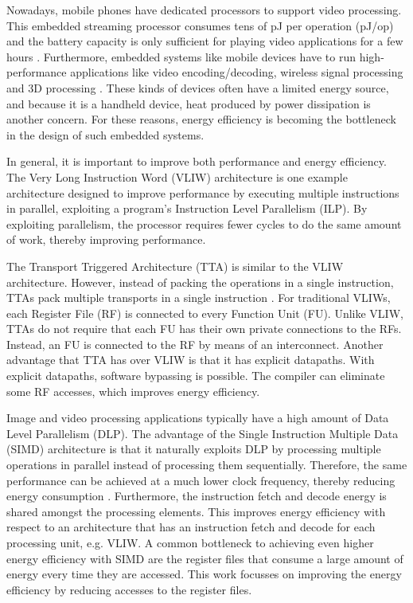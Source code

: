 Nowadays, mobile phones have dedicated processors to support video processing. This embedded streaming processor consumes tens of pJ per operation (pJ/op) and the battery capacity is only sufficient for playing video applications for a few hours \cite{simd}.
Furthermore, embedded systems like mobile devices have to run high-performance applications like video encoding/decoding, wireless signal processing and 3D processing \cite{dongrio1}. These kinds of devices often have a limited energy source, and because it is a handheld device, heat produced by power dissipation is another concern. For these reasons, energy efficiency is becoming the bottleneck in the design of such embedded systems.

In general, it is important to improve both performance and energy efficiency. The Very Long Instruction Word (VLIW) architecture is one example architecture designed to improve performance by executing multiple instructions in parallel, exploiting a program's Instruction Level Parallelism (ILP). By exploiting parallelism, the processor requires fewer cycles to do the same amount of work, thereby improving performance. 

The Transport Triggered Architecture (TTA) is similar to the VLIW architecture. However, instead of packing the operations in a single instruction, TTAs pack multiple transports in a single instruction \cite{tta}. For traditional VLIWs, each Register File (RF) is connected to every Function Unit (FU). Unlike VLIW, TTAs do not require that each FU has their own private connections to the RFs. Instead, an FU is connected to the RF by means of an interconnect. Another advantage that TTA has over VLIW is that it has explicit datapaths. With explicit datapaths, software bypassing is possible. The compiler can eliminate some RF accesses, which improves energy efficiency.


Image and video processing applications typically have a high amount of Data Level Parallelism (DLP). The advantage of the Single Instruction Multiple Data (SIMD) architecture is that it naturally exploits DLP by processing multiple operations in parallel instead of processing them sequentially. Therefore, the same performance can be achieved at a much lower clock frequency, thereby reducing energy consumption \cite{dongrio1}. Furthermore, the instruction fetch and decode energy is shared amongst the processing elements. This improves energy efficiency with respect to an architecture that has an instruction fetch and decode for each processing unit, e.g. VLIW. A common bottleneck to achieving even higher energy efficiency with SIMD are the register files that consume a large amount of energy every time they are accessed. This work focusses on improving the energy efficiency by reducing accesses to the register files.

